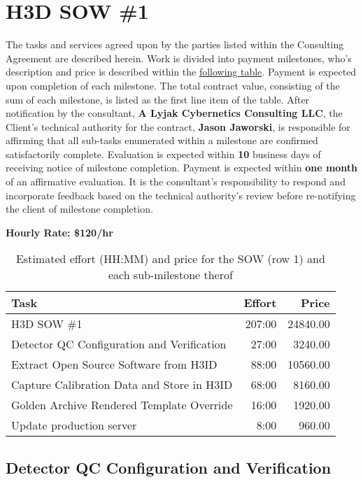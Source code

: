 \documentclass[11pt]{article}
\author{Andrew Lyjak}
\date{\today}
\title{}
\begin{document}
\section{H3D SOW \#1}
\label{sec:org44e3bcb}
The tasks and services agreed upon by the parties listed within the Consulting Agreement are
described herein. Work is divided into payment milestones, who's description and price is described
within the \hyperref[orge36fabf]{following table}. Payment is expected upon completion of each milestone. The total
contract value, consisting of the sum of each milestone, is listed as the first line item of the
table. After notification by the consultant, \textbf{A Lyjak Cybernetics Consulting LLC}, the Client's
technical authority for the contract, \textbf{Jason Jaworski}, is responsible for affirming that all
sub-tasks enumerated within a milestone are confirmed satisfactorily complete. Evaluation is
expected within \textbf{10} business days of receiving notice of milestone completion. Payment is expected
within \textbf{one month} of an affirmative evaluation. It is the consultant's responsibility to respond
and incorporate feedback based on the technical authority's review before re-notifying the client of
milestone completion.


\textbf{Hourly Rate: \$120/hr}

\label{orge36fabf}
\begin{table}[htbp]
\caption{Estimated effort (HH:MM) and price for the SOW (row 1) and each sub-milestone therof}
\centering
\begin{tabular}{lrr}
Task & Effort & Price\\
\hline
H3D SOW \#1 & 207:00 & 24840.00\\
\hline
Detector QC Configuration and Verification & 27:00 & 3240.00\\
\hline
Extract Open Source Software from H3ID & 88:00 & 10560.00\\
\hline
Capture Calibration Data and Store in H3ID & 68:00 & 8160.00\\
\hline
Golden Archive Rendered Template Override & 16:00 & 1920.00\\
\hline
Update production server & 8:00 & 960.00\\
\end{tabular}
\end{table}


\subsection{Detector QC Configuration and Verification}
\label{sec:orgacb0af2}
\end{document}
